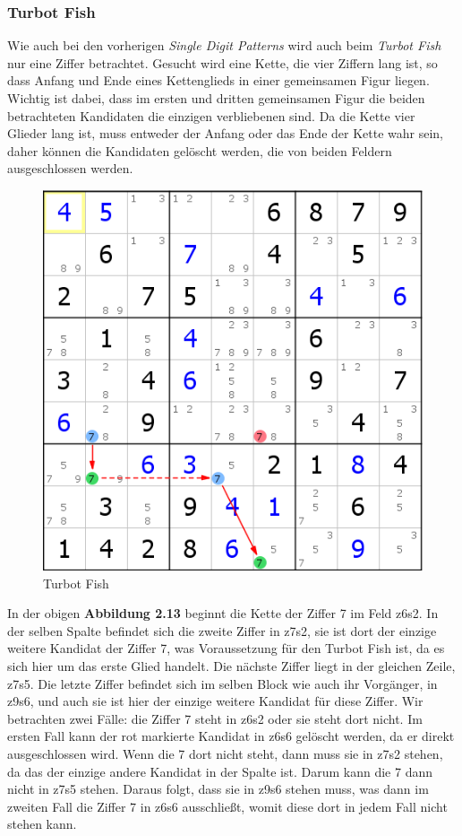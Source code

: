 \newpage
\subsubsection{Turbot Fish}
Wie auch bei den vorherigen \textit{Single Digit Patterns} wird auch beim \textit{Turbot Fish} nur eine Ziffer betrachtet. Gesucht wird eine Kette, die vier Ziffern lang ist, so dass Anfang und Ende eines Kettenglieds in einer gemeinsamen Figur liegen. Wichtig ist dabei, dass im ersten und dritten gemeinsamen Figur die beiden betrachteten Kandidaten die einzigen verbliebenen  sind. Da die Kette vier Glieder lang ist, muss entweder der Anfang oder das Ende der Kette wahr sein, daher können die Kandidaten gelöscht werden, die von beiden Feldern ausgeschlossen werden.

\begin{figure}[h]
\begin{center}
\includegraphics{./img/turbot_fish.png}
\caption{Turbot Fish}
\end{center}
\end{figure}

\noindent In der obigen \textbf{Abbildung 2.13} beginnt die Kette der Ziffer 7 im Feld z6s2. In der selben Spalte befindet sich die zweite Ziffer in z7s2, sie ist dort der einzige weitere Kandidat der Ziffer 7, was Voraussetzung für den Turbot Fish ist, da es sich hier um das erste Glied handelt. Die nächste Ziffer liegt in der gleichen Zeile, z7s5. Die letzte Ziffer befindet sich im selben Block wie auch ihr Vorgänger, in z9s6, und auch sie ist hier der einzige weitere Kandidat für diese Ziffer. Wir betrachten zwei Fälle: die Ziffer 7 steht in z6s2 oder sie steht dort nicht. Im ersten Fall kann der rot markierte Kandidat in z6s6 gelöscht werden, da er direkt ausgeschlossen wird. Wenn die 7 dort nicht steht, dann muss sie in z7s2 stehen, da das der einzige andere Kandidat in der Spalte ist. Darum kann die 7 dann nicht in z7s5 stehen. Daraus folgt, dass sie in z9s6 stehen muss, was dann im zweiten Fall die Ziffer 7 in z6s6 ausschließt, womit diese dort in jedem Fall nicht stehen kann.